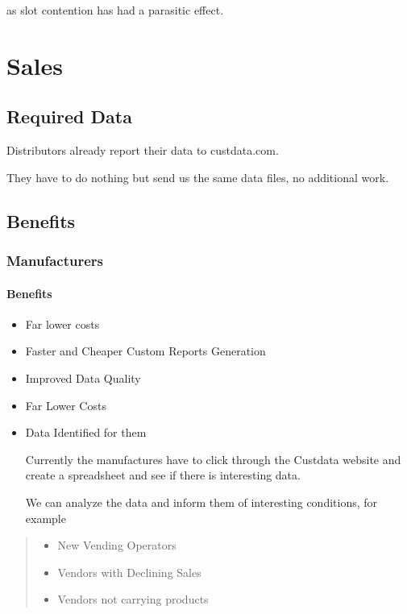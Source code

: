 \documentclass[letterpaper,10pt,english]{sphinxmanual}
\begin{document}
as slot contention has had a parasitic effect.


\chapter{Sales}
\label{\detokenize{index:sales}}

\section{Required Data}
\label{\detokenize{index:required-data}}
Distributors already report their data to custdata.com.

They have to do nothing but send us the same data files, no additional work.


\section{Benefits}
\label{\detokenize{index:id1}}

\subsection{Manufacturers}
\label{\detokenize{index:manufacturers}}

\subsubsection{Benefits}
\label{\detokenize{index:id2}}\begin{itemize}
\item {} 
Far lower costs

\item {} 
Faster and Cheaper Custom Reports Generation

\item {} 
Improved Data Quality

\item {} 
Far Lower Costs

\item {} 
Data Identified for them

Currently the manufactures have to click through the Custdata website and create a spreadsheet and see if there is
interesting data.

We can analyze the data and inform them of interesting conditions, for example

\end{itemize}
\begin{quote}
\begin{itemize}
\item {} 
New Vending Operators

\item {} 
Vendors with Declining Sales

\item {} 
Vendors not carrying products

\end{itemize}
\end{quote}
\end{document}
